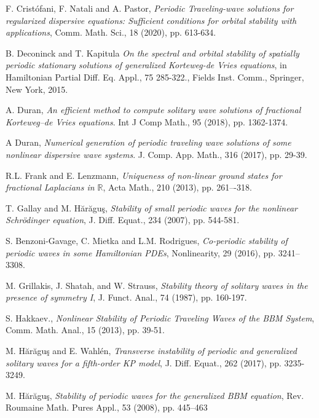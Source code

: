 \documentclass[12pt,reqno]{amsart}
\newcommand{\2}{L^2_{per}(0, T)}
\numberwithin{equation}{section}
\numberwithin{figure}{section}
\begin{document}
\begin{thebibliography}{99}
 {\sc F. Crist\'ofani, F. Natali and A. Pastor}, \textit{Periodic Traveling-wave solutions for regularized dispersive equations: Sufficient conditions for orbital stability with applications}, Comm. Math. Sci., 18 (2020), pp. 613-634.


 {\sc B. Deconinck and T. Kapitula}
\textit{On the spectral and orbital stability of spatially periodic stationary
	solutions of generalized Korteweg-de Vries equations}, in Hamiltonian Partial Diff. Eq.
Appl., 75 285-322., Fields Inst. Comm., Springer, New York, 2015.

 {\sc A. Duran}, \textit{An efficient method to compute solitary wave solutions of fractional Korteweg–de Vries equations}. Int J Comp Math.,  95 (2018), pp. 1362-1374.


 {\sc A Duran}, \textit{Numerical generation of periodic traveling wave solutions of
some nonlinear dispersive wave systems}. J. Comp. App. Math.,  316 (2017), pp. 29-39.


 {\sc R.L. Frank and E. Lenzmann}, \textit{Uniqueness of non-linear ground states for fractional Laplacians in $\mathbb{R}$}, Acta Math., 210 (2013), pp. 261–-318.

 {\sc T. Gallay and M. H\u{a}r\u{a}gu\c{s}}, \textit{Stability of small periodic waves for the nonlinear Schrödinger equation}, J. Diff. Equat., 234 (2007), pp. 544-581.

 {\sc S. Benzoni-Gavage, C. Mietka and L.M. Rodrigues}, \textit{Co-periodic stability of periodic waves in some Hamiltonian PDEs}, Nonlinearity, 29 (2016), pp. 3241–3308.

 {\sc M. Grillakis, J. Shatah, and W. Strauss},
\textit{Stability theory
of solitary waves in the presence of symmetry I}, J. Funct.
Anal., 74 (1987), pp. 160-197.

 {\sc S. Hakkaev.}, \textit{Nonlinear Stability of Periodic Traveling Waves of the BBM System}, Comm. Math. Anal., 15 (2013), pp. 39-51.


 {\sc M. H\u{a}r\u{a}gu\c{s} and E. Wahl\'en}, \textit{Transverse instability of periodic and generalized solitary waves for a fifth-order KP model}, J. Diff. Equat., 262 (2017), pp. 3235-3249.


 {\sc M. H\u{a}r\u{a}gu\c{s}}, \textit{Stability of periodic waves for the generalized BBM equation}, Rev. Roumaine Math. Pures Appl., 53 (2008), pp. 445--463





\end{thebibliography}
\end{document}

